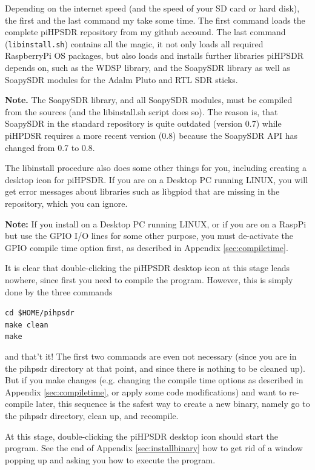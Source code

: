 \documentclass[12pt]{book}
\def\grtt#1{\texttt{\color{magenta}#1}}
\begin{document}
Depending on the internet speed (and the speed of your SD card or hard disk), the first and the
last command my take some time. The first command loads the complete piHPSDR repository from
my github accound. The last command (\texttt{libinstall.sh}) contains all the magic,
it not only loads all required RaspberryPi OS packages,
but also loads and installs further libraries piHPSDR depends on, such as the WDSP library,
and the SoapySDR library as well as SoapySDR modules for the Adalm Pluto and RTL SDR sticks.

\textbf{Note.} The SoapySDR library, and all SoapySDR modules, must be compiled from the sources
(and the libinstall.sh script does so). The reason is, that SoapySDR in the standard repository
is quite outdated (version 0.7) while piHPDSR requires a more recent version (0.8) because the
SoapySDR API has changed from 0.7 to 0.8.

The libinstall procedure also does some other things for you, including creating a desktop icon
for piHPSDR. If you are on a Desktop PC running LINUX, you will get error messages about
libraries such as libgpiod that are missing in the repository, which you can ignore.

\textbf{Note:} If you install on a Desktop PC running LINUX, or if you are on a RaspPi but use
the GPIO I/O lines for some other purpose, you must de-activate the GPIO compile time option
first, as described in Appendix \ref{sec:compiletime}.

It is clear that double-clicking the piHPSDR desktop icon at this stage leads nowhere,
since first you need to compile the program.
However,
this is simply done by the three commands

\grtt{cd \$HOME/pihpsdr} \\
\grtt{make clean} \\
\grtt{make}

and that't it! The first  two commands are even not necessary (since you are in the pihpsdr
directory at that point, and since there is nothing to be cleaned up).
But if you make changes (e.g. changing the compile time options as described in
Appendix \ref{sec:compiletime}, or apply some code modifications)
and want to re-compile later, this sequence is the safest way to create a new binary,
namely go to the pihpsdr
directory, clean up, and recompile.

At this stage, double-clicking the piHPSDR desktop icon should start the program. See
the end of Appendix \ref{sec:installbinary} how to get rid of a window popping up
and asking you how to execute the program.
\end{document}
